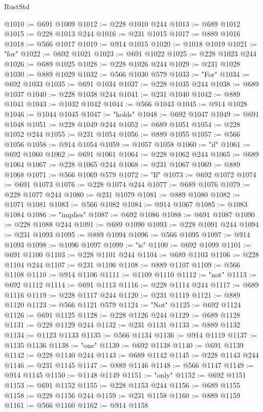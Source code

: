 \begin{lexlean}{RustStd}
\begin{coremodule}
@1010 := @691 @1009
@1012 := @228 @1010 @244
@1013 := @689 @1012
@1015 := @228 @1013 @244
@1016 := @231 @1015
@1017 := @889 @1016
@1018 := @566 @1017
@1019 := @914 @1015
@1020 := @1018 @1019
@1021 := "for"
@1022 := @692 @1021
@1023 := @691 @1022
@1025 := @228 @1023 @244
@1026 := @689 @1025
@1028 := @228 @1026 @244
@1029 := @231 @1028
@1030 := @889 @1029
@1032 := @566 @1030 @579
@1033 := "For"
@1034 := @692 @1033
@1035 := @691 @1034
@1037 := @228 @1035 @244
@1038 := @689 @1037
@1040 := @228 @1038 @244
@1041 := @231 @1040
@1042 := @889 @1041
@1043 := @1032 @1042
@1044 := @566 @1043
@1045 := @914 @1028
@1046 := @1044 @1045
@1047 := "holds"
@1048 := @692 @1047
@1049 := @691 @1048
@1051 := @228 @1049 @244
@1052 := @689 @1051
@1054 := @228 @1052 @244
@1055 := @231 @1054
@1056 := @889 @1055
@1057 := @566 @1056
@1058 := @914 @1054
@1059 := @1057 @1058
@1060 := "if"
@1061 := @692 @1060
@1062 := @691 @1061
@1064 := @228 @1062 @244
@1065 := @689 @1064
@1067 := @228 @1065 @244
@1068 := @231 @1067
@1069 := @889 @1068
@1071 := @566 @1069 @579
@1072 := "If"
@1073 := @692 @1072
@1074 := @691 @1073
@1076 := @228 @1074 @244
@1077 := @689 @1076
@1079 := @228 @1077 @244
@1080 := @231 @1079
@1081 := @889 @1080
@1082 := @1071 @1081
@1083 := @566 @1082
@1084 := @914 @1067
@1085 := @1083 @1084
@1086 := "implies"
@1087 := @692 @1086
@1088 := @691 @1087
@1090 := @228 @1088 @244
@1091 := @689 @1090
@1093 := @228 @1091 @244
@1094 := @231 @1093
@1095 := @889 @1094
@1096 := @566 @1095
@1097 := @914 @1093
@1098 := @1096 @1097
@1099 := "is"
@1100 := @692 @1099
@1101 := @691 @1100
@1103 := @228 @1101 @244
@1104 := @689 @1103
@1106 := @228 @1104 @244
@1107 := @231 @1106
@1108 := @889 @1107
@1109 := @566 @1108
@1110 := @914 @1106
@1111 := @1109 @1110
@1112 := "not"
@1113 := @692 @1112
@1114 := @691 @1113
@1116 := @228 @1114 @244
@1117 := @689 @1116
@1119 := @228 @1117 @244
@1120 := @231 @1119
@1121 := @889 @1120
@1123 := @566 @1121 @579
@1124 := "Not"
@1125 := @692 @1124
@1126 := @691 @1125
@1128 := @228 @1126 @244
@1129 := @689 @1128
@1131 := @228 @1129 @244
@1132 := @231 @1131
@1133 := @889 @1132
@1134 := @1123 @1133
@1135 := @566 @1134
@1136 := @914 @1119
@1137 := @1135 @1136
@1138 := "one"
@1139 := @692 @1138
@1140 := @691 @1139
@1142 := @228 @1140 @244
@1143 := @689 @1142
@1145 := @228 @1143 @244
@1146 := @231 @1145
@1147 := @889 @1146
@1148 := @566 @1147
@1149 := @914 @1145
@1150 := @1148 @1149
@1151 := "only"
@1152 := @692 @1151
@1153 := @691 @1152
@1155 := @228 @1153 @244
@1156 := @689 @1155
@1158 := @228 @1156 @244
@1159 := @231 @1158
@1160 := @889 @1159
@1161 := @566 @1160
@1162 := @914 @1158

\end{coremodule}
\end{lexlean}
